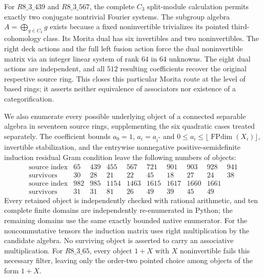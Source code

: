 For $R8\_3\_439$ and $R8\_3\_567$, the complete $C_3$ split-module
calculation permits exactly two conjugate nontrivial Fourier systems.
The subgroup algebra $A=\bigoplus_{g\in C_3}g$ exists because a fixed
noninvertible trivializes its pointed third-cohomology class. Its Morita
dual has six invertibles and two noninvertibles. The right deck actions
and the full left fusion action force the dual noninvertible matrix via
an integer linear system of rank $64$ in $64$ unknowns. The eight dual
actions are independent, and all $512$ resulting coefficients recover
the original respective source ring. This closes this particular Morita
route at the level of based rings; it asserts neither equivalence of
associators nor existence of a categorification.

We also enumerate every possible underlying object of a connected
separable algebra in seventeen source rings, supplementing the six
quadratic cases treated separately.
The coefficient bounds $a_0=1$, $a_i=a_{i^*}$ and
$0\leq a_i\leq\lfloor\operatorname{FPdim}(X_i)\rfloor$, invertible
stabilization, and the entrywise nonnegative positive-semidefinite
induction residual Gram condition leave the following numbers of objects:
\[
\begin{array}{c|rrrrrrrrr}
\text{source index}&65&439&455&567&721&901&903&928&941\\
\text{survivors}&30&28&21&22&45&18&27&24&38\\[2pt]
\text{source index}&982&985&1154&1463&1615&1617&1660&1661&\\
\text{survivors}&31&31&81&26&49&39&45&49&
\end{array}
\]
Every retained object is independently checked with rational arithmetic,
and ten complete finite domains are independently re-enumerated in
Python; the remaining domains use the same exactly bounded native
enumerator. For the noncommutative tensors
the induction matrix uses right multiplication by the candidate algebra.
No surviving object is asserted to carry an associative multiplication.
For $R8\_3\_65$, every object $1+X$ with $X$ noninvertible fails this
necessary filter, leaving only the order-two pointed choice among
objects of the form $1+X$.

